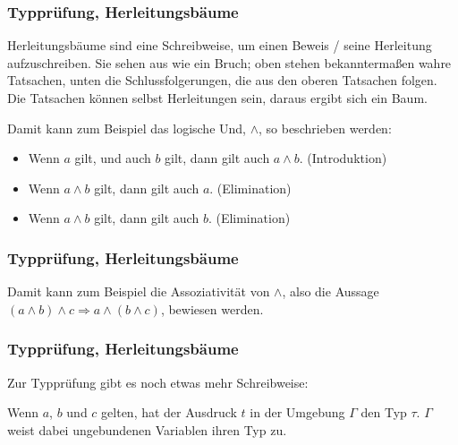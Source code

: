 \documentclass{beamer}
\begin{document}
\begin{frame}
  \frametitle{Typprüfung, Herleitungsbäume}
  Herleitungsbäume sind eine Schreibweise, um einen Beweis / seine Herleitung aufzuschreiben.
  Sie sehen aus wie ein Bruch;
  oben stehen bekanntermaßen wahre Tatsachen,
  unten die Schlussfolgerungen, die aus den oberen Tatsachen folgen.
  Die Tatsachen können selbst Herleitungen sein, daraus ergibt sich ein Baum.
  
  Damit kann zum Beispiel das logische Und, $∧$, so beschrieben werden:
  \begin{itemize}
  \item
    Wenn $a$ gilt, und auch $b$ gilt, dann gilt auch $a ∧ b$. (Introduktion)
    \begin{prooftree}
       
    \end{prooftree}
  \item
    Wenn $a ∧ b$ gilt, dann gilt auch $a$. (Elimination)
    \begin{prooftree}
    \end{prooftree}
  \item
    Wenn $a ∧ b$ gilt, dann gilt auch $b$. (Elimination)
    \begin{prooftree}
    \end{prooftree}
  \end{itemize}
\end{frame}

\begin{frame}
  \frametitle{Typprüfung, Herleitungsbäume}
  Damit kann zum Beispiel die Assoziativität von $∧$,
  also die Aussage $(a ∧ b) ∧ c \Rightarrow a ∧ (b ∧ c)$,
  bewiesen werden.
  \begin{prooftree}
  \end{prooftree}
\end{frame}

\begin{frame}
  \frametitle{Typprüfung, Herleitungsbäume}
  Zur Typprüfung gibt es noch etwas mehr Schreibweise:
  \begin{prooftree}
  \end{prooftree}
  Wenn $a$, $b$ und $c$ gelten,
  hat der Ausdruck $t$ in der Umgebung $Γ$ den Typ $τ$.
  $Γ$ weist dabei ungebundenen Variablen ihren Typ zu.
\end{frame}
\end{document}
